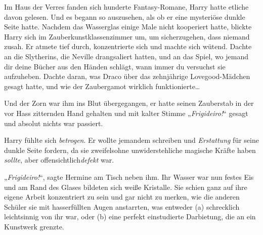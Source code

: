 Im Haus der Verres fanden sich hunderte Fantasy-Romane, Harry hatte etliche davon gelesen. Und es begann so auszusehen, als ob er eine mysteriöse dunkle Seite hatte. Nachdem das Wasserglas einige Male nicht kooperiert hatte, blickte Harry sich im Zauberkunstklassenzimmer um, um sicherzugehen, dass niemand zusah. Er atmete tief durch, konzentrierte sich und machte sich wütend. Dachte an die Slytherins, die Neville drangsaliert hatten, und an das Spiel, wo jemand dir deine Bücher aus den Händen schlägt, wann immer du versuchst sie aufzuheben. Dachte daran, was Draco über das zehnjährige Lovegood-Mädchen gesagt hatte, und wie der Zaubergamot wirklich funktionierte…

Und der Zorn war ihm ins Blut übergegangen, er hatte seinen Zauberstab in der vor Hass zitternden Hand gehalten und mit kalter Stimme „\emph{Frigideiro!}“ gesagt und absolut nichts war passiert.

Harry fühlte sich \emph{betrogen}. Er wollte jemandem schreiben und \emph{Erstattung} für seine dunkle Seite fordern, da sie zweifelsohne unwiderstehliche magische Kräfte haben \emph{sollte}, aber offensichtlich\emph{defekt} war.

„\emph{Frigideiro!}“, sagte Hermine am Tisch neben ihm. Ihr Wasser war nun festes Eis und am Rand des Glases bildeten sich weiße Kristalle. Sie schien ganz auf ihre eigene Arbeit konzentriert zu sein und gar nicht zu merken, wie die anderen Schüler sie mit hasserfüllten Augen anstarrten, was entweder (a) schrecklich leichtsinnig von ihr war, oder (b) eine perfekt einstudierte Darbietung, die an ein Kunstwerk grenzte.

